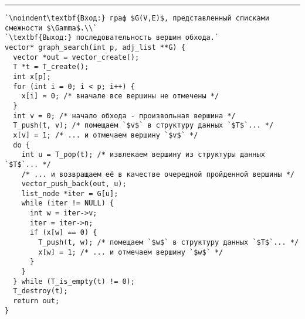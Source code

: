 \vspace{5pt} \hrule
\begin{lstlisting}[caption={Поиск в ширину и в глубину}, label=p258_graph_search, escapechar=`]
`\noindent\textbf{Вход:} граф $G(V,E)$, представленный списками смежности $\Gamma$.\\`
`\textbf{Выход:} последовательность вершин обхода.`
vector* graph_search(int p, adj_list **G) {
  vector *out = vector_create();
  T *t = T_create();
  int x[p];
  for (int i = 0; i < p; i++) {
    x[i] = 0; /* вначале все вершины не отмечены */
  }
  int v = 0; /* начало обхода - произвольная вершина */
  T_push(t, v); /* помещаем `$v$` в структуру данных `$T$`... */
  x[v] = 1; /* ... и отмечаем вершину `$v$` */
  do {
    int u = T_pop(t); /* извлекаем вершину из структуры данных `$T$`... */
    /* ... и возвращаем её в качестве очередной пройденной вершины */
    vector_push_back(out, u);
    list_node *iter = G[u];
    while (iter != NULL) {
      int w = iter->v;
      iter = iter->n;
      if (x[w] == 0) {
        T_push(t, w); /* помещаем `$w$` в структуру данных `$T$`... */
        x[w] = 1; /* ... и отмечаем вершину `$w$` */
      }
    }
  } while (T_is_empty(t) != 0);
  T_destroy(t);
  return out;
}
\end{lstlisting}
